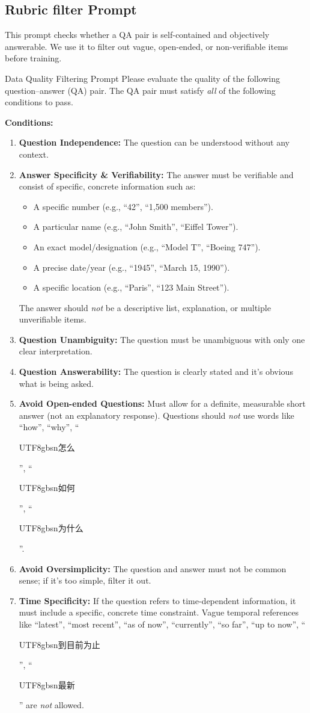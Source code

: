 \documentclass{article} %
\newcommand{\zh}[1]{\begin{CJK*}{UTF8}{gbsn}#1\end{CJK*}}
\newcommand{\zh}[1]{#1}
\theoremstyle{plain}
\theoremstyle{definition}
\theoremstyle{remark}
\begin{document}
\subsection{Rubric filter Prompt}
\label{sec:app_filter_prompt}

This prompt checks whether a QA pair is self-contained and objectively answerable.
We use it to filter out vague, open-ended, or non-verifiable items before training.

\begin{promptbox}{Data Quality Filtering Prompt}
Please evaluate the quality of the following question--answer (QA) pair. The QA pair must satisfy \emph{all} of the following conditions to pass.

\textbf{Conditions:}
\begin{enumerate}
    \item \textbf{Question Independence:} The question can be understood without any context.
    \item \textbf{Answer Specificity \& Verifiability:} The answer must be verifiable and consist of specific, concrete information such as:
    \begin{itemize}
        \item A specific number (e.g., ``42'', ``1,500 members'').
        \item A particular name (e.g., ``John Smith'', ``Eiffel Tower'').
        \item An exact model/designation (e.g., ``Model T'', ``Boeing 747'').
        \item A precise date/year (e.g., ``1945'', ``March 15, 1990'').
        \item A specific location (e.g., ``Paris'', ``123 Main Street'').
    \end{itemize}
    The answer should \emph{not} be a descriptive list, explanation, or multiple unverifiable items.
    \item \textbf{Question Unambiguity:} The question must be unambiguous with only one clear interpretation.
    \item \textbf{Question Answerability:} The question is clearly stated and it's obvious what is being asked.
    \item \textbf{Avoid Open-ended Questions:} Must allow for a definite, measurable short answer (not an explanatory response). Questions should \emph{not} use words like ``how'', ``why'', ``\zh{怎么}'', ``\zh{如何}'', ``\zh{为什么}''.
    \item \textbf{Avoid Oversimplicity:} The question and answer must not be common sense; if it's too simple, filter it out.
    \item \textbf{Time Specificity:} If the question refers to time-dependent information, it must include a specific, concrete time constraint. Vague temporal references like ``latest'', ``most recent'', ``as of now'', ``currently'', ``so far'', ``up to now'', ``\zh{到目前为止}'', ``\zh{最新}'' are \emph{not} allowed.
\end{enumerate}


\end{promptbox}
\end{document}
